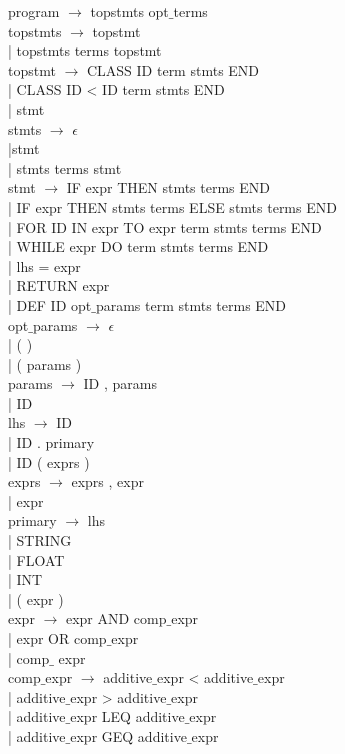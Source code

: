 \documentclass{article}
\begin{document}
program $\rightarrow$ topstmts opt$\_$terms \\
topstmts $\rightarrow$ topstmt \\
         | topstmts terms topstmt \\
topstmt $\rightarrow$ CLASS ID term stmts END \\
| CLASS ID < ID term stmts END \\
| stmt \\
stmts $\rightarrow$ $\epsilon$ \\
|stmt \\
| stmts terms stmt \\
stmt $\rightarrow$ IF expr THEN stmts terms END \\
| IF expr THEN stmts terms ELSE stmts terms END \\
| FOR ID IN expr TO expr term stmts terms END \\
| WHILE expr DO term stmts terms END \\
| lhs = expr \\
| RETURN expr \\
| DEF ID opt$\_$params term stmts terms END \\
opt$\_$params $\rightarrow$ $\epsilon$ \\
| ( ) \\
| ( params ) \\
params $\rightarrow$ ID , params \\
| ID \\
lhs $\rightarrow$ ID \\
| ID . primary \\
| ID ( exprs ) \\
exprs $\rightarrow$ exprs , expr \\
| expr \\
primary $\rightarrow$ lhs \\
| STRING \\
| FLOAT \\
| INT \\
| ( expr ) \\
expr $\rightarrow$ expr AND comp$\_$expr \\
| expr OR comp$\_$expr \\
| comp$\_$ expr \\
comp$\_$expr $\rightarrow$ additive$\_$expr < additive$\_$expr \\
| additive$\_$expr > additive$\_$expr \\  
| additive$\_$expr LEQ additive$\_$expr \\  
| additive$\_$expr GEQ additive$\_$expr \\  
\end{document}
